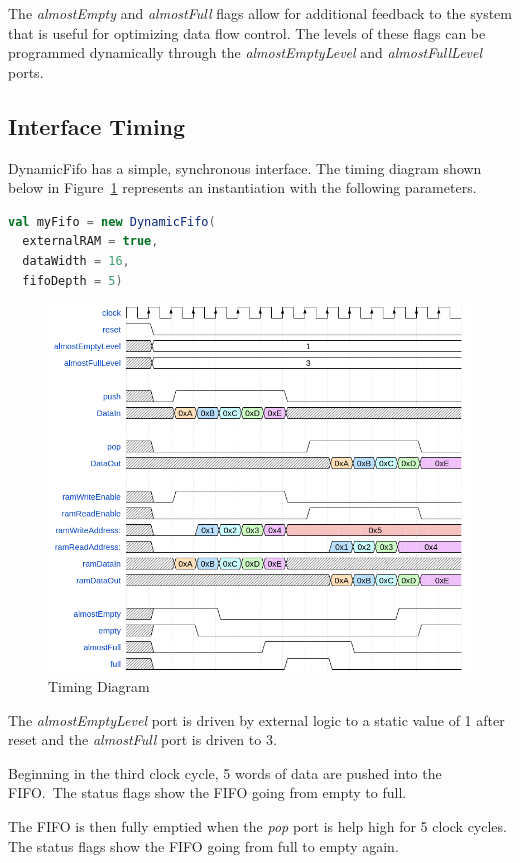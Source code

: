 The \textit{almostEmpty} and \textit{almostFull} flags allow for additional
feedback to the system that is useful for optimizing data flow control. The
levels of these flags can be programmed dynamically through the
\textit{almostEmptyLevel} and \textit{almostFullLevel} ports.

\newpage
\subsection{Interface Timing}

DynamicFifo has a simple, synchronous interface. The timing diagram shown below
in Figure~\ref{fig:timing} represents an instantiation with the following 
parameters.

\begin{lstlisting}[language=Scala]
val myFifo = new DynamicFifo(
  externalRAM = true, 
  dataWidth = 16, 
  fifoDepth = 5) 
\end{lstlisting}

\begin{figure}[h]
  \includegraphics[width=\textwidth]{images/timing.png}
  \caption{Timing Diagram}\label{fig:timing}
\end{figure}

The \textit{almostEmptyLevel} port is driven by external logic to a static value 
of 1 after reset and the \textit{almostFull} port is driven to 3.

Beginning in the third clock cycle, 5 words of data are pushed into the 
FIFO.\ The status flags show the FIFO going from empty to full.

The FIFO is then fully emptied when the \textit{pop} port is help high for
5 clock cycles. The status flags show the FIFO going from full to empty again.
